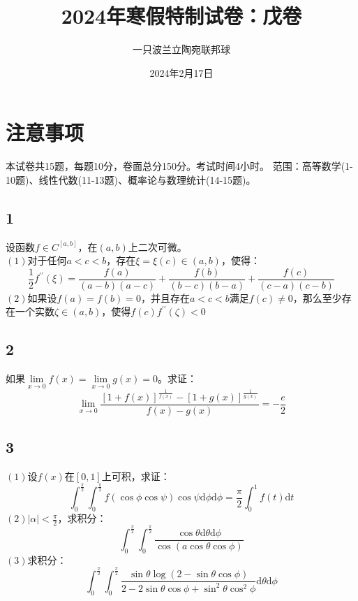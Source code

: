 \documentclass[a4paper,12pt]{article}
\title{2024年寒假特制试卷：戊卷}
\author{一只波兰立陶宛联邦球}
\date{2024年2月17日}
\begin{document}
\maketitle
\section*{注意事项}
本试卷共15题，每题10分，卷面总分150分。考试时间4小时。
范围：高等数学(1-10题)、线性代数(11-13题)、概率论与数理统计(14-15题)。
\subsection*{1}\noindent 设函数$f\in C^{[a,b]}$，在$\left(a,b\right)$上二次可微。\\
\noindent$\left(1\right)$对于任何$a<c<b$，存在$\xi=\xi\left(c\right)\in\left(a,b\right)$，使得：\begin{equation*}
	\frac{1}{2}f^{\prime\prime}\left(\xi\right)=\frac{f\left(a\right)}{\left(a-b\right)\left(a-c\right)}+\frac{f\left(b\right)}{\left(b-c\right)\left(b-a\right)}+\frac{f\left(c\right)}{\left(c-a\right)\left(c-b\right)}
\end{equation*}
\noindent$\left(2\right)$如果设$f\left(a\right)=f\left(b\right)=0$，并且存在$a<c<b$满足$f\left(c\right)\neq0$，那么至少存在一个实数$\zeta\in\left(a,b\right)$，使得$f\left(c\right)f^{\prime\prime}\left(\zeta\right)<0$
\subsection*{2}\noindent 如果$\lim\limits_{x\rightarrow0}f\left(x\right)=\lim\limits_{x\rightarrow0}g\left(x\right)=0$。求证：
\begin{equation*}
	\lim\limits_{x\rightarrow0}\frac{\left[1+f\left(x\right)\right]^{\frac{1}{f\left(x\right)}}-\left[1+g\left(x\right)\right]^{\frac{1}{g\left(x\right)}}}{f\left(x\right)-g\left(x\right)}=-\frac{e}{2}
\end{equation*}
\subsection*{3}\noindent$\left(1\right)$设$f\left(x\right)$在$\left[0,1\right]$上可积，求证：
\begin{equation*}
	\int_{0}^{\frac{\pi}{2}}\int_{0}^{\frac{\pi}{2}}f\left(\cos\phi\cos\psi\right)\cos\psi\mathrm{d}\phi\mathrm{d}\phi=\frac{\pi}{2}\int_{0}^{1}f\left(t\right)\mathrm{d}t
\end{equation*}
\noindent$\left(2\right)$$\left|\alpha\right|<\frac{\pi}{2}$，求积分：
\begin{equation*}
	\int_{0}^{\frac{\pi}{2}}\int_{0}^{\frac{\pi}{2}}\frac{\cos\theta\mathrm{d}\theta\mathrm{d}\phi}{\cos\left(a\cos\theta\cos\phi\right)}
\end{equation*}
\noindent$\left(3\right)$求积分：
\begin{equation*}
	\int_{0}^{\frac{\pi}{2}}\int_{0}^{\frac{\pi}{2}}\frac{\sin\theta\log\left(2-\sin\theta\cos\phi\right)}{2-2\sin\theta\cos\phi+\sin^2\theta\cos^2\phi}\mathrm{d}\theta\mathrm{d}\phi
\end{equation*}
\end{document}
